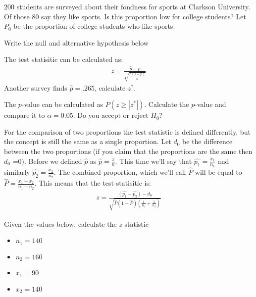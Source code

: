 \begin{problem}
\item 200 students are surveyed about their fondness for sports at
  Clarkson University. Of those 80 say they like sports. Is this
  proportion low for college students? Let $P_{0}$ be the proportion
  of college students who like sports.
  \begin{subproblem}
  \item Write the null and alternative hypothesis below
    \vspace{3em}

  \item The test statisitic can be calculated as:
    \begin{eqnarray*}
      z=\frac{\hat{p}-p}{\sqrt{\frac{p(1-p)}{n}}}
    \end{eqnarray*}
    Another survey finds $\hat{p} = .265$, calculate $z^*$.

    \vfill

  \item The $p$-value can be calculated as $P(z \ge |z^*|).$ Calculate
    the $p$-value and compare it to $\alpha = 0.05$. Do you accept or
    reject $H_{0}$?

    \vfill

\end{subproblem}

\clearpage

\item For the comparison of two proportions the test statistic is
  defined differently, but the concept is still the same as a single
  proportion. Let $d_{0}$ be the difference between the two
  proportions (if you claim that the proportions are the same then
  $d_{0}$ =0). Before we defined $\hat{p}$ as
  $\hat{p}=\frac{x}{n}$. This time we'll say that
  $\hat{p_{1}} = \frac{x_{1}}{n_{1}}$ and similarly
  $\hat{p_{2}} = \frac{x_{2}}{n_{2}}$. The combined proportion, which
  we'll call $\hat{P}$ will be equal to
  $\hat{P} = \frac{x_{1}+x_{2}}{n_{1}+n_{2}}$. This means that the
  test statisitic is:
  \begin{eqnarray*}
    z=\frac{(\hat{p_{1}}-\hat{p_{2}})-d_{0}}{
    \sqrt{\hat{P}(1-\hat{P})\left(\frac{1}{n_{1}}+\frac{1}{n_{2}}\right)}}
  \end{eqnarray*}

  \begin{subproblem}
  \item Given the values below, calculate the $z$-statistic
    \begin{itemize}
    \item $n_{1} = 140 $
    \item $n_{2} = 160 $
    \item $x_{1} = 90 $
    \item $x_{2} = 140$
    \end{itemize}


\end{subproblem}
\end{problem}
